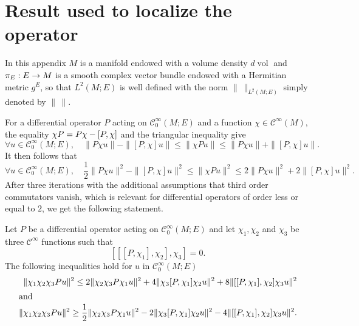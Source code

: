 \documentclass[AHL,Unicode,longabstracts]{cedram}
\newcommand{\clC}{\mathcal{C}}
\DeclareMathOperator{\voll}{vol}
\let\oldforall\forall
\renewcommand*{\forall}{\mathrel{\oldforall}}
\let\originalleft\left
\let\originalright\right
\renewcommand{\left}{\mathopen{}\mathclose\bgroup\originalleft}
\renewcommand{\right}{\aftergroup\egroup\originalright}
\renewcommand*{\to}{\mathchoice{\longrightarrow}{\rightarrow}{\rightarrow}{\rightarrow}}
\begin{document}
\section{Result used to localize the operator}

In this appendix $M$ is a manifold endowed with a volume density $d\voll$ and $\pi_{E}:E\to M$ is a smooth complex vector bundle endowed with a Hermitian metric $g^{E}$, so that $L^{2}(M;E)$ is well defined with the norm $\|\,\|_{L^{2}(M;E)}$ simply denoted by $\|\,\|$.

For a differential operator $P$ acting on $\clC^{\infty}_{0}(M;E)$ and a function $\chi\in \clC^{\infty}(M)$, the equality $\chi P= P\chi -\left[P,\chi\right]$ and the triangular inequality give
\[
\forall u \in \clC^{\infty}_{0}(M;E),\quad \|P\chi u \| - \|[P,\chi]u\| \leq \| \chi Pu \| \leq \|P \chi u \| + \|[P,\chi] u\|.
\]
It then follows that
\[
\forall u \in \clC^{\infty}_{0}(M;E),\quad \frac{1}{2}\|P\chi u\|^{2} - \|[P,\chi]u\|^{2} \leq \|\chi P u\|^{2} \leq 2\|P \chi u\|^{2} + 2\|[P,\chi]u\|^{2}.
\]
After three iterations with the additional assumptions that third order commutators vanish, which is relevant for differential operators of order less or equal to $2$, we get the following statement.
\begin{prop}
Let $P$ be a differential operator acting on $\clC^{\infty}_{0}(M;E)$ and let $\chi_{1},\chi_{2}$ and $\chi_{3}$ be three $\clC^{\infty}$ functions such that
\begin{equation}\label{eq:Cond3com}
[[[P,\chi_{1}],\chi_{2}],\chi_{3}]=0.
\end{equation}
The following inequalities hold for $u$ in $\clC^{\infty}_{0}(M;E)$
\begin{align*}
\|\chi_{1}\chi_{2}\chi_{3} Pu \|^{2} \leq 2\|\chi_{2}\chi_{3}P\chi_{1}u \|^{2} + 4 \|\chi_{3}[P,\chi_{1}]\chi_{2}u \|^{2}+8 \|[[P,\chi_{1}],\chi_{2}]\chi_{3} u \|^{2}
\\
\intertext{and}
\|\chi_{1}\chi_{2}\chi_{3} Pu \|^{2} \geq \frac{1}{2}\|\chi_{2}\chi_{3}P\chi_{1}u \|^{2} - 2 \|\chi_{3}[P,\chi_{1}]\chi_{2}u \|^{2} -4 \|[[P,\chi_{1}],\chi_{2}]\chi_{3} u \|^{2}.
\end{align*}
\end{prop}
\end{document}

